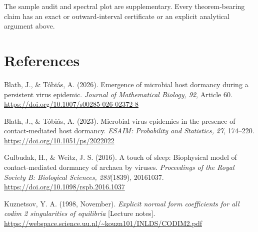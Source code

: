 \documentclass[
  11pt,
]{article}
\begin{document}
The sample audit and spectral plot are supplementary. Every
theorem-bearing claim has an exact or outward-interval certificate or an
explicit analytical argument above.

\section{References}\label{references}

Blath, J., \& Tóbiás, A. (2026). Emergence of microbial host dormancy
during a persistent virus epidemic. \emph{Journal of Mathematical
Biology, 92}, Article 60.
\url{https://doi.org/10.1007/s00285-026-02372-8}

Blath, J., \& Tóbiás, A. (2023). Microbial virus epidemics in the
presence of contact-mediated host dormancy. \emph{ESAIM: Probability and
Statistics, 27}, 174--220. \url{https://doi.org/10.1051/ps/2022022}

Gulbudak, H., \& Weitz, J. S. (2016). A touch of sleep: Biophysical
model of contact-mediated dormancy of archaea by viruses.
\emph{Proceedings of the Royal Society B: Biological Sciences,
283}(1839), 20161037. \url{https://doi.org/10.1098/rspb.2016.1037}

Kuznetsov, Y. A. (1998, November). \emph{Explicit normal form
coefficients for all codim 2 singularities of equilibria} {[}Lecture
notes{]}.
\url{https://webspace.science.uu.nl/~kouzn101/INLDS/CODIM2.pdf}
\end{document}
